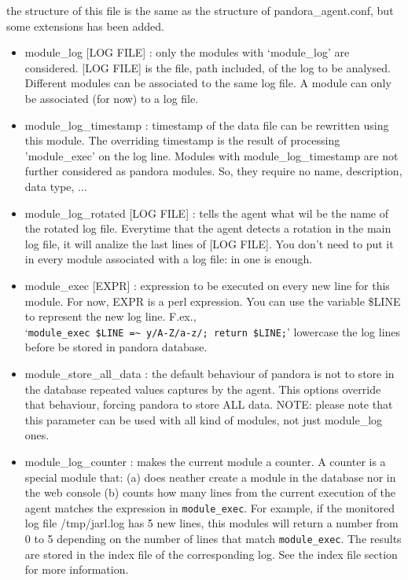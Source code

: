 \documentclass[a4paper,10pt]{article}
\begin{document}
      the structure of this file is the same as the structure of 
      pandora\_agent.conf, but some extensions has been added.

\begin{itemize}
\item        module\_log [LOG FILE] :  only the modules with `module\_log' are 
	considered. [LOG FILE] is the file, path included, of the log to
	be analysed. Different modules can be associated to the same log
	file. A module can only be associated (for now) to a log file.
      
\item        module\_log\_timestamp  :  timestamp of the data file can be rewritten
	using this module. The overriding timestamp is the result of 
	processing 'module\_exec' on the log line. Modules with 
	module\_log\_timestamp are not further considered as pandora modules.
	So, they require no name, description, data type, ...
     
\item      	module\_log\_rotated [LOG FILE] :  tells the agent what wil be the name
      	of the rotated log file. Everytime that the agent detects a rotation
      	in the main log file, it will analize the last lines of [LOG FILE]. 
      	You don't need to put it in every module associated with a log file:
      	in one is enough.
      
\item        module\_exec [EXPR]  :  expression to be executed on every new line for
	this module. For now, EXPR is a perl expression. You can use the 
	variable \$LINE to represent the new log line. F.ex., \\
	`\verb|module_exec $LINE =~ y/A-Z/a-z/; return $LINE;|' lowercase the log
	lines before be stored in pandora database.
     
\item        module\_store\_all\_data  :   the default behaviour of pandora is not to
        store in the database repeated values captures by the agent. This 
        options override that behaviour, forcing pandora to store ALL data.
        NOTE:  please note that this parameter can be used with all kind of
        modules, not just module\_log ones.

\item 	module\_log\_counter   :   makes the current module a counter. A counter is a special module that: (a) does neather create a module in the database nor in the web console (b) counts how many lines from the current execution of the agent matches the expression in \verb|module_exec|. For example, if the monitored log file /tmp/jarl.log has 5 new lines, this modules will return a number from 0 to 5 depending on the number of lines that match \verb|module_exec|. The results are stored in the index file of the corresponding log. See the index file section for more information.

\end{itemize}
\end{document}
